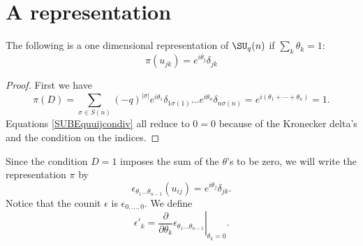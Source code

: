 \section{A representation}

\begin{proposition}     \label{PropReprezThetasuqn}
	The following is a one dimensional representation of $\SU_q(n)$ if $\sum_k\theta_k=1$:
	\begin{equation}
		\pi(u_{jk})= e^{i\theta_j}\delta_{jk}
	\end{equation}
\end{proposition}

\begin{proof}
	First we have
	\begin{equation}
		\pi(D)=\sum_{\sigma\in S(n)}(-q)^{| \sigma |} e^{i\theta_1}\delta_{1\sigma(1)}\ldots e^{i\theta_n}\delta_{n\sigma(n)}= e^{i(\theta_1+\cdots+\theta_n)}=1.
	\end{equation}
	Equations \eqref{SUBEquuijcondiv} all reduce to $0=0$ because of the Kronecker delta's and the condition on the indices.
\end{proof}

Since the condition $D=1$ imposes the sum of the $\theta$'s to be zero, we will write the representation $\pi$ by
\begin{equation}
	\epsilon_{\theta_1\ldots\theta_{n-1}}(u_{ij})= e^{i\theta_j}\delta_{jk}.
\end{equation}
Notice that the counit $\epsilon$ is $\epsilon_{0,\ldots,0}$. We define
\begin{equation}
	\epsilon'_k=\left.\frac{ \partial  }{ \partial \theta_k }\epsilon_{\theta_1\ldots\theta_{n-1}}\right|_{\theta_k=0}.
\end{equation}

